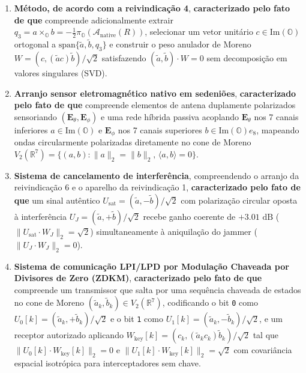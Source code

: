 \documentclass[12pt,a4paper]{article}
\begin{document}
\begin{enumerate}[leftmargin=20pt,itemsep=4pt]
    \item \textbf{M\'etodo, de acordo com a reivindica\c{c}\~ao 4}, \textbf{caracterizado pelo fato de que} compreende adicionalmente extrair $q_3 = a \times_{\mathbb{O}} b = -\frac{1}{2}\pi_{\mathbb{O}}(\mathcal{A}_{\mathrm{native}}(R))$, selecionar um vetor unit\'ario $c \in \mathrm{Im}(\mathbb{O})$ ortogonal a $\mathrm{span}\{\tilde{a}, \tilde{b}, q_3\}$ e construir o peso anulador de Moreno $W = (c, (\tilde{a}c)\tilde{b})/\sqrt{2}$ satisfazendo $(\tilde{a}, \tilde{b}) \cdot W = 0$ sem decomposi\c{c}\~ao em valores singulares (SVD).

    \item \textbf{Arranjo sensor eletromagn\'etico nativo em sedeni\~oes}, \textbf{caracterizado pelo fato de que} compreende elementos de antena duplamente polarizados sensoriando $(\mathbf{E}_\theta, \mathbf{E}_\phi)$ e uma rede h\'ibrida passiva acoplando $\mathbf{E}_\theta$ nos 7 canais inferiores $a \in \mathrm{Im}(\mathbb{O})$ e $\mathbf{E}_\phi$ nos 7 canais superiores $b \in \mathrm{Im}(\mathbb{O})e_8$, mapeando ondas circularmente polarizadas diretamente no cone de Moreno $V_2(\mathbb{R}^7) = \{(a,b) : \|a\|_2 = \|b\|_2,\, \langle a, b \rangle = 0\}$.

    \item \textbf{Sistema de cancelamento de interfer\^encia}, compreendendo o arranjo da reivindica\c{c}\~ao 6 e o aparelho da reivindica\c{c}\~ao 1, \textbf{caracterizado pelo fato de que} um sinal aut\^entico $U_{\mathrm{sat}} = (\tilde{a}, -\tilde{b})/\sqrt{2}$ com polariza\c{c}\~ao circular oposta \`a interfer\^encia $U_J = (\tilde{a}, +\tilde{b})/\sqrt{2}$ recebe ganho coerente de $+3.01\text{ dB}$ ($\|U_{\mathrm{sat}}\cdot W_J\|_2 = \sqrt{2}$) simultaneamente \`a aniquila\c{c}\~ao do jammer ($\|U_J\cdot W_J\|_2 = 0$).

    \item \textbf{Sistema de comunica\c{c}\~ao LPI/LPD por Modula\c{c}\~ao Chaveada por Divisores de Zero (ZDKM)}, \textbf{caracterizado pelo fato de que} compreende um transmissor que salta por uma sequ\^encia chaveada de estados no cone de Moreno $(\tilde{a}_k, \tilde{b}_k) \in V_2(\mathbb{R}^7)$, codificando o bit \texttt{0} como $U_0[k] = (\tilde{a}_k, +\tilde{b}_k)/\sqrt{2}$ e o bit \texttt{1} como $U_1[k] = (\tilde{a}_k, -\tilde{b}_k)/\sqrt{2}$, e um receptor autorizado aplicando $W_{\mathrm{key}}[k] = (c_k, (\tilde{a}_k c_k)\tilde{b}_k)/\sqrt{2}$ tal que $\|U_0[k] \cdot W_{\mathrm{key}}[k]\|_2 = 0$ e $\|U_1[k] \cdot W_{\mathrm{key}}[k]\|_2 = \sqrt{2}$ com covari\^ancia espacial isotr\'opica para interceptadores sem chave.


\end{enumerate}
\end{document}
